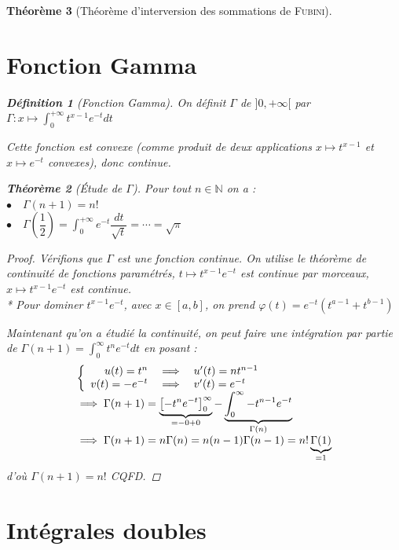 \documentclass[11pt,a4paper]{report}
\newtheorem{theorem}{Théorème}[chapter]
\newtheorem{itheorem}[theorem]{Théorème}
\theoremstyle{definition}
\newtheorem{dfn}[theorem]{Définition}
\begin{document}
\begin{theorem}[Théorème d'interversion des sommations de \textsc{Fubini}]
{{\section{Fonction Gamma}
\begin{dfn}[Fonction Gamma]
On définit $\Gamma$ de $]0,+\infty[$ par
$\Gamma : x \mapsto  \int_0^{+\infty}t^{x-1}e^{-t}dt$
\end{dfn}
Cette fonction est convexe (comme produit de deux applications $x \mapsto t^{x-1}$ et $x \mapsto e^{-t}$ convexes), donc continue.
\begin{itheorem}[Étude de $\Gamma$]
Pour tout $n\in\mathbb{N}$ on a :\\
 $\bullet \quad \Gamma{}(n+1)=n!$\\
 $\bullet \quad \Gamma \left( \dfrac{1}{2} \right) =\int_{0}^{+\infty}e^{-t}\dfrac{dt}{\sqrt{t}}=\cdots=\sqrt{\pi}$
\end{itheorem}
\begin{proof}
Vérifions que $\Gamma$ est une fonction continue. On utilise le théorème de continuité de fonctions paramétrés, $t \mapsto t^{x-1}e^{-t} $ est continue par morceaux, $x \mapsto t^{x-1}e^{-t} $ est continue. \\*
Pour dominer $t^{x-1}e^{-t}$, avec $x \in [a,b]$, on prend $\varphi (t)= e^{-t}(t^{a-1}+t^{b-1}) $
\par
Maintenant qu'on a étudié la continuité, on peut faire une intégration par partie de $\Gamma (n+1) = \int_0 ^\infty t^{n} e^{-t} dt$ en posant : 
\[
\begin{array}{l}
  \left\lbrace
		\begin{array}{r c l}
		u(t) = t^n &\implies & u'(t) = nt^{n-1}\\
		v(t) = -e^{-t} &\implies & v'(t) = e^{-t}
		\end{array}
  \right. \\
\implies \Gamma(n+1)=\underbrace{\left[ -t^n e^{-t} \right]_0^\infty}_{\mathclap{= -0 + 0}} - \underbrace{\int_0^\infty -t^{n-1}e^{-t}}_{\Gamma(n)}\\
\implies \Gamma(n+1)=n\Gamma(n)=n(n-1)\Gamma(n-1)=n!\underbrace{\Gamma(1)}_{=1}
\end{array}
\]
d'où $\Gamma(n+1)=n!$	CQFD.
\end{proof}
\section{Intégrales doubles}

}}
\end{theorem}
\end{document}

